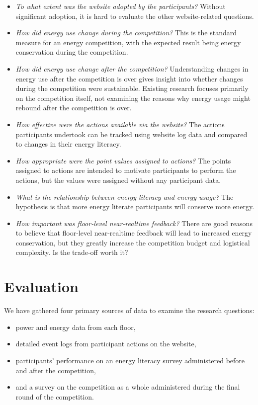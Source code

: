 \begin{itemize}
	\item \emph{To what extent was the website adopted by the participants?} Without significant adoption, it is hard to evaluate the other website-related questions.
	\item \emph{How did energy use change during the competition?} This is the standard measure for an energy competition, with the expected result being energy conservation during the competition.
	\item \emph{How did energy use change after the competition?} Understanding changes in energy use after the competition is over gives insight into whether changes during the competition were sustainable. Existing research focuses primarily on the competition itself, not examining the reasons why energy usage might rebound after the competition is over.
	\item \emph{How effective were the actions available via the website?} The actions participants undertook can be tracked using website log data and compared to changes in their energy literacy.
	\item \emph{How appropriate were the point values assigned to actions?} The points assigned to actions are intended to motivate participants to perform the actions, but the values were assigned without any participant data.
	\item \emph{What is the relationship between energy literacy and energy usage?} The hypothesis is that more energy literate participants will conserve more energy.
	\item \emph{How important was floor-level near-realtime feedback?} There are good reasons to believe that floor-level near-realtime feedback will lead to increased energy conservation, but they greatly increase the competition budget and logistical complexity. Is the trade-off worth it?
\end{itemize}


\section{Evaluation}
We have gathered four primary sources of data to examine the research questions:

\begin{itemize}
	\item power and energy data from each floor,
	\item detailed event logs from participant actions on the website,
	\item participants' performance on an energy literacy survey administered before and after the competition,
	\item and a survey on the competition as a whole administered during the final round of the competition.
\end{itemize}


